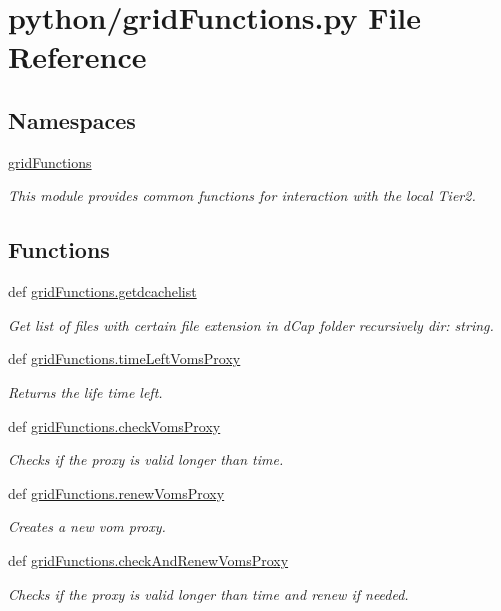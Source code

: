 \section{python/grid\-Functions.py File Reference}
\label{gridFunctions_8py}
\subsection*{Namespaces}
\begin{DoxyCompactItemize}
\item 
\hyperlink{namespacegridFunctions}{grid\-Functions}
\begin{DoxyCompactList}\small\item\em This module provides common functions for interaction with the local Tier2. \end{DoxyCompactList}\end{DoxyCompactItemize}
\subsection*{Functions}
\begin{DoxyCompactItemize}
\item 
def \hyperlink{namespacegridFunctions_a4e79293482a3e6c550544cbb604b31a2}{grid\-Functions.\-getdcachelist}
\begin{DoxyCompactList}\small\item\em Get list of files with certain file extension in d\-Cap folder recursively  dir\-: string. \end{DoxyCompactList}\item 
def \hyperlink{namespacegridFunctions_afcaaf26f40337917700fdbba5358c40a}{grid\-Functions.\-time\-Left\-Voms\-Proxy}
\begin{DoxyCompactList}\small\item\em Returns the life time left. \end{DoxyCompactList}\item 
def \hyperlink{namespacegridFunctions_a6e867b80786f4b466ec8438cab40603c}{grid\-Functions.\-check\-Voms\-Proxy}
\begin{DoxyCompactList}\small\item\em Checks if the proxy is valid longer than time. \end{DoxyCompactList}\item 
def \hyperlink{namespacegridFunctions_a52fea718b08534d76e61a53dd43e2402}{grid\-Functions.\-renew\-Voms\-Proxy}
\begin{DoxyCompactList}\small\item\em Creates a new vom proxy. \end{DoxyCompactList}\item 
def \hyperlink{namespacegridFunctions_a62e5066cf1057859a9b43a8c88066960}{grid\-Functions.\-check\-And\-Renew\-Voms\-Proxy}
\begin{DoxyCompactList}\small\item\em Checks if the proxy is valid longer than time and renew if needed. \end{DoxyCompactList}\end{DoxyCompactItemize}
